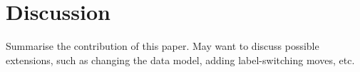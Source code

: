 % 
% 

\section{Discussion}
Summarise the contribution of this paper. May want to discuss possible extensions, such as changing the data model, adding label-switching moves, etc.


